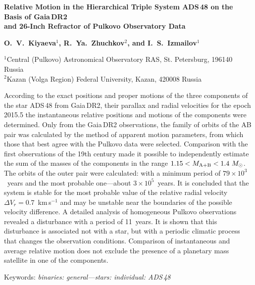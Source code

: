 \documentclass[
 aps, pra,
 amsmath,amssymb,
 11pt,
 final,
tightenlines,
 twoside,
 twocolumn,
 nofloats,
nofootinbib,
 superscriptaddress,
showkeys,
showkeywords,
 ]
{revtex4-2}
\begin{document}
\begin{center}\bfseries Relative Motion in the Hierarchical Triple
System ADS\,48 on the Basis of Gaia\,DR2 \\and 26-Inch Refractor
of Pulkovo Observatory Data
\end{center}
%
\begin{center}
\bfseries O.~V.~Kiyaeva$^1$, R.~Ya.~Zhuchkov$^2$, and
I.~S.~Izmailov$^1$
\end{center}
%
\begin{center}
 \footnotesize

 $^1$Central (Pulkovo) Astronomical Observatory
RAS, St. Petersburg, 196140 Russia\\
 $^2$Kazan (Volga Region) Federal University, Kazan, 420008 Russia
\end{center}
%
\begin{center}
\begin{minipage}{\textwidth - 2cm}
\small According to the exact positions and proper motions of the
three components of the star ADS\,48 from Gaia\,DR2, their
parallax and radial velocities for the epoch 2015.5 the
instantaneous relative positions and motions of the components
were determined. Only from the Gaia\,DR2 observations, the family
of orbits of the AB pair was calculated by the method of apparent
motion parameters, from which those that best agree with the
Pulkovo data were selected. Comparison with the first observations
of the 19th century made it possible to independently estimate the
sum of the masses of the components in the range
\mbox{$1.15<M_{\rm A+B}<1.4~M_\odot$}. The orbits of the outer
pair were calculated: with a minimum period of
$79\times10^3$~years and the most probable one---about
$3\times10^5$~years. It is concluded that the system is stable for
the most probable value of the relative radial velocity
$\Delta{V_r}=0.7$~km\,s$^{-1}$ and may be unstable near the
boundaries of the possible velocity difference. A detailed
analysis of homogeneous Pulkovo observations revealed a
disturbance with a period of 11~years. It is shown that this
disturbance is associated not with a star, but with a periodic
climatic process that changes the observation conditions.
Comparison of instantaneous and average relative motion does not
exclude the presence of a planetary mass satellite in one of the
components.
\end{minipage}
\end{center}

\begin{center}
\begin{minipage}{\textwidth - 2cm}

Keywords: {\it binaries: general---stars: individual: ADS\,48}
\end{minipage}
\end{center}
\end{document}
